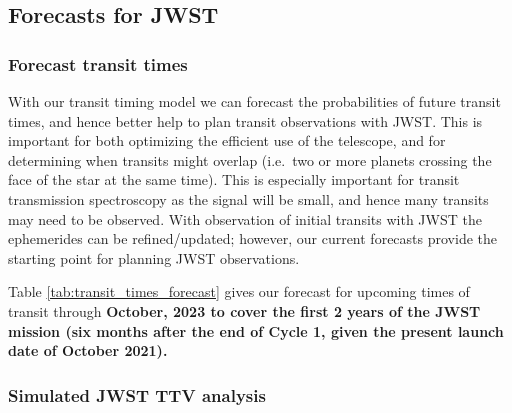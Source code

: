 \documentclass[twocolumn]{aastex63}
\begin{document}
\subsection{Forecasts for JWST}

%


\subsubsection{Forecast transit times}

With our transit timing model we can forecast the probabilities of future transit times,
and hence better help to plan transit observations with JWST.  This is
important for both optimizing the efficient use of the telescope, and for
determining when transits might overlap (i.e.\ two or more planets crossing the face
of the star at the same time).  This is especially important for transit
transmission spectroscopy as the signal will be small, and hence many
transits may need to be observed.  With observation of initial transits
with JWST the ephemerides can be refined/updated;  however, our current
forecasts provide the starting point for planning JWST observations.

Table \ref{tab:transit_times_forecast} gives our forecast for upcoming times of transit through \textbf{October, 2023 to cover the first 2 years of the JWST mission (six months after the end of Cycle 1, given the present launch date of October 2021).}

\subsubsection{Simulated JWST TTV analysis}
\end{document}
